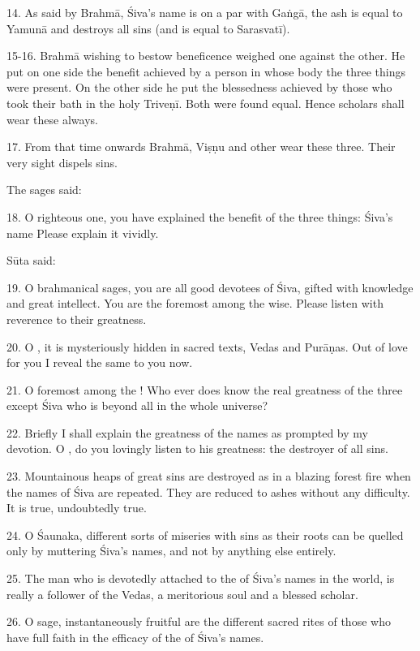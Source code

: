 14. As said by Brahmā, Śiva’s name is on a par with Gaṅgā, the ash is equal to
Yamunā and  destroys all sins (and is equal to Sarasvatī).

15-16. Brahmā wishing to bestow beneficence weighed one against the other. He
put on one side the benefit achieved by a person in whose body the three things
were present. On the other side he put the blessedness achieved by those who
took their bath in the holy Triveṇī. Both were found equal. Hence scholars shall
wear these always.

17. From that time onwards Brahmā, Viṣṇu and other  wear these three.
Their very sight dispels sins.

The sages said:

18. O righteous one, you have explained the benefit of the three things: Śiva’s
name \etc Please explain it vividly.

Sūta said:

19. O brahmanical sages, you are all good devotees of Śiva, gifted with
knowledge and great intellect. You are the foremost among the wise. Please
listen with reverence to their greatness.

20. O , it is mysteriously hidden in sacred texts, Vedas and
Purāṇas. Out of love for you I reveal the same to you now.

21. O foremost among the ! Who ever does know the real greatness
of the three except Śiva who is beyond all in the whole universe?

22. Briefly I shall explain the greatness of the names as prompted by my
devotion. O , do you lovingly listen to his greatness:
the destroyer of all sins.

23. Mountainous heaps of great sins are destroyed as in a blazing forest fire
when the names of Śiva are repeated. They are reduced to ashes without any
difficulty. It is true, undoubtedly true.

24. O Śaunaka, different sorts of miseries with sins as their roots can be
quelled only by muttering Śiva’s names, and not by anything else entirely.

25. The man who is devotedly attached to the  of Śiva’s names in
the world, is really a follower of the Vedas, a meritorious soul and a blessed
scholar.

26. O sage, instantaneously fruitful are the different sacred rites of those who
have full faith in the efficacy of the  of Śiva’s names.

